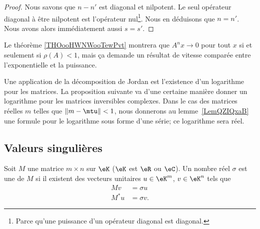 \begin{proof}
	Nous savons que \( n-n'\) est diagonal et nilpotent. Le seul opérateur diagonal à être nilpotent est l'opérateur nul\footnote{Parce qu'une puissance d'un opérateur diagonal est diagonal.}. Nous en déduisons que \( n=n'\). Nous avons alors immédiatement aussi \( s=s'\).
\end{proof}

\begin{normaltext}
	Le théorème \ref{THOooHWNWooTewPvt} montrera que \( A^nx\to 0\) pour tout \( x\) si et seulement si \( \rho(A)<1\), mais ça demande un résultat de vitesse comparée entre l'exponentielle et la puissance.
\end{normaltext}

Une application de la décomposition de Jordan est l'existence d'un logarithme pour les matrices. La proposition suivante va d'une certaine manière donner un logarithme pour les matrices inversibles complexes. Dans le cas des matrices réelles \( m\) telles que \( \| m-\mtu \|<1\), nous donnerons au lemme~\ref{LemQZIQxaB} une formule pour le logarithme sous forme d'une série; ce logarithme sera réel.

\subsection{Valeurs singulières}

\begin{definition}
	Soit \( M\) une matrice \( m\times n\) sur \( \eK\) (\( \eK\) est \( \eR\) ou \( \eC\)). Un nombre réel \( \sigma\) est une  de \( M\) si il existent des vecteurs unitaires \( u\in \eK^m\), \( v\in \eK^n\) tels que
	\begin{subequations}
		\begin{align}
			Mv   & =\sigma u  \\
			M^*u & =\sigma v.
		\end{align}
	\end{subequations}
\end{definition}

